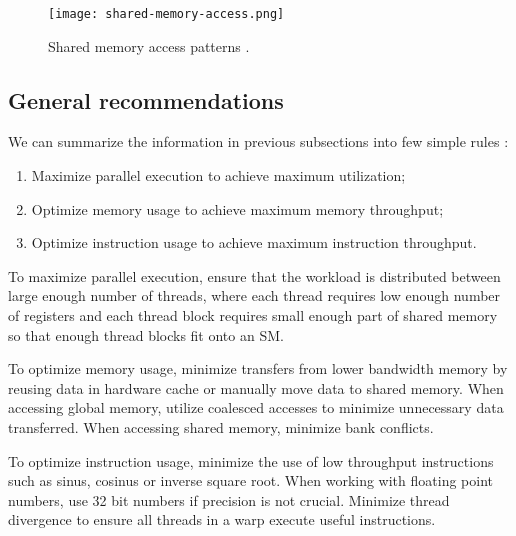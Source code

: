 \begin{figure}[ht]
	\centering
	\texttt{[image: shared-memory-access.png]}
	\caption{Shared memory access patterns \citep{site:cuda}.}
	\label{fig:shared_memory_access}
\end{figure}

\subsection{General recommendations}

We can summarize the information in previous subsections into few simple rules \citep{site:cuda}:

\begin{enumerate}
	\item Maximize parallel execution to achieve maximum utilization;
	\item Optimize memory usage to achieve maximum memory throughput;
	\item Optimize instruction usage to achieve maximum instruction throughput.
\end{enumerate}

To maximize parallel execution, ensure that the workload is distributed between large enough number of threads, where each thread requires low enough number of registers and each thread block requires small enough part of shared memory so that enough thread blocks fit onto an SM.

To optimize memory usage, minimize transfers from lower bandwidth memory by reusing data in hardware cache or manually move data to shared memory. When accessing global memory, utilize coalesced accesses to minimize unnecessary data transferred. When accessing shared memory, minimize bank conflicts.

To optimize instruction usage, minimize the use of low throughput instructions such as sinus, cosinus or inverse square root. When working with floating point numbers, use 32 bit numbers if precision is not crucial. Minimize thread divergence to ensure all threads in a warp execute useful instructions.








